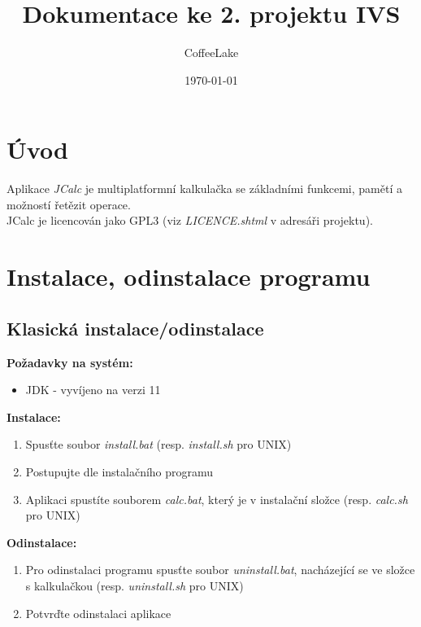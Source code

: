 \documentclass[a4paper, 11pt]{article}
\title{Dokumentace ke 2. projektu IVS}
\author{CoffeeLake}
\date{\today}
\begin{document}
	
\maketitle
\tableofcontents


\newpage

\section{Úvod}

Aplikace \emph{JCalc} je multiplatformní kalkulačka se základními funkcemi, pamětí a možností řetězit operace.\\
JCalc je licencován jako GPL3 (viz \emph{LICENCE.shtml} v adresáři projektu).


\section{Instalace, odinstalace programu}

\subsection{Klasická instalace/odinstalace}

\textbf{Požadavky na systém:}

\begin{itemize}
    \item JDK - vyvíjeno na verzi 11
\end{itemize}

\noindent
\textbf{Instalace:}

\begin{enumerate}
    \item Spusťte soubor \emph{install.bat} (resp. \emph{install.sh} pro UNIX)
    \item Postupujte dle instalačního programu
    \item Aplikaci spustíte souborem \emph{calc.bat}, který je v instalační složce (resp. \emph{calc.sh} pro UNIX)
\end{enumerate}

\noindent
\textbf{Odinstalace:}

\begin{enumerate}
    \item Pro odinstalaci programu spusťte soubor \emph{uninstall.bat}, nacházející se ve složce s kalkulačkou (resp. \emph{uninstall.sh} pro UNIX)
    \item Potvrďte odinstalaci aplikace
\end{enumerate}
\end{document}
